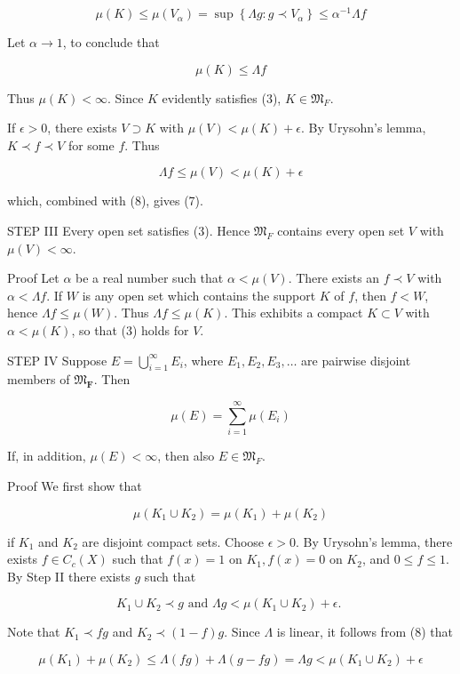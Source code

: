 \documentclass[10pt]{article}
\begin{document}
$$
\mu(K) \leq \mu\left(V_{\alpha}\right)=\sup \left\{\Lambda g: g \prec V_{\alpha}\right\} \leq \alpha^{-1} \Lambda f
$$

Let $\alpha \rightarrow 1$, to conclude that

$$
\mu(K) \leq \Lambda f
$$

Thus $\mu(K)<\infty$. Since $K$ evidently satisfies (3), $K \in \mathfrak{M}_{F}$.

If $\epsilon>0$, there exists $V \supset K$ with $\mu(V)<\mu(K)+\epsilon$. By Urysohn's lemma, $K \prec f \prec V$ for some $f$. Thus

$$
\Lambda f \leq \mu(V)<\mu(K)+\epsilon
$$

which, combined with (8), gives (7).

STEP III Every open set satisfies (3). Hence $\mathfrak{M}_{F}$ contains every open set $V$ with $\mu(V)<\infty$.

Proof Let $\alpha$ be a real number such that $\alpha<\mu(V)$. There exists an $f \prec V$ with $\alpha<\Lambda f$. If $W$ is any open set which contains the support $K$ of $f$, then $f<W$, hence $\Lambda f \leq \mu(W)$. Thus $\Lambda f \leq \mu(K)$. This exhibits a compact $K \subset V$ with $\alpha<\mu(K)$, so that (3) holds for $V$.

STEP IV Suppose $E=\bigcup_{i=1}^{\infty} E_{i}$, where $E_{1}, E_{2}, E_{3}, \ldots$ are pairwise disjoint members of $\mathfrak{M}_{\boldsymbol{F}}$. Then

$$
\mu(E)=\sum_{i=1}^{\infty} \mu\left(E_{i}\right)
$$

If, in addition, $\mu(E)<\infty$, then also $E \in \mathfrak{M}_{F}$.

Proof We first show that

$$
\mu\left(K_{1} \cup K_{2}\right)=\mu\left(K_{1}\right)+\mu\left(K_{2}\right)
$$

if $K_{1}$ and $K_{2}$ are disjoint compact sets. Choose $\epsilon>0$. By Urysohn's lemma, there exists $f \in C_{c}(X)$ such that $f(x)=1$ on $K_{1}, f(x)=0$ on $K_{2}$, and $0 \leq f \leq 1$. By Step II there exists $g$ such that

$$
K_{1} \cup K_{2} \prec g \text { and } \Lambda g<\mu\left(K_{1} \cup K_{2}\right)+\epsilon \text {. }
$$

Note that $K_{1} \prec f g$ and $K_{2} \prec(1-f) g$. Since $\Lambda$ is linear, it follows from (8) that

$$
\mu\left(K_{1}\right)+\mu\left(K_{2}\right) \leq \Lambda(f g)+\Lambda(g-f g)=\Lambda g<\mu\left(K_{1} \cup K_{2}\right)+\epsilon
$$
\end{document}
